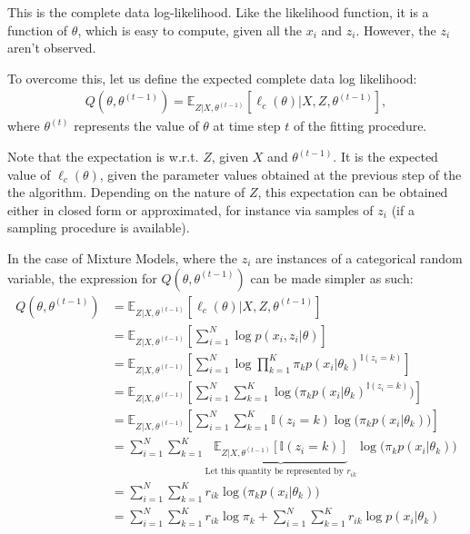 This is the complete data log-likelihood. Like the likelihood function, it is a
function of $\theta$, which is easy to compute, given all the $x_i$ and $z_i$.
However, the $z_i$ aren't observed.

To overcome this, let us define the expected complete data log likelihood:
\begin{align}
    Q(\theta, \theta^{(t-1)}) = \mathbb{E}_{Z|X, \theta^{(t-1)}}[\ell_c(\theta) | X, Z, \theta^{(t-1)}],
\end{align} where $\theta^{(t)}$ represents the value of $\theta$ at time step
$t$ of the fitting procedure.

Note that the expectation is w.r.t. $Z$, given $X$ and $\theta^{(t-1)}$. It is the
expected value of $\ell_c(\theta)$, given the parameter values obtained at the
previous step of the the algorithm. Depending on the nature of $Z$, this expectation
can be obtained either in closed form or approximated, for instance via samples
of $z_i$ (if a sampling procedure is available).

In the case of Mixture Models, where the $z_i$ are instances of a categorical
random variable, the expression for $Q(\theta, \theta^{(t-1)})$ can be made
simpler as such:
\begin{align}
    Q(\theta, \theta^{(t-1)}) &= \mathbb{E}_{Z|X, \theta^{(t-1)}}[\ell_c(\theta) | X, Z, \theta^{(t-1)}] \\
    &= \mathbb{E}_{Z|X, \theta^{(t-1)}}[\sum_{i=1}^N \log p(x_i, z_i | \theta)] \\
    &= \mathbb{E}_{Z|X, \theta^{(t-1)}}[\sum_{i=1}^N \log \prod_{k=1}^K \pi_k p(x_i | \theta_k)^{\mathbb{I}(z_i = k)}] \\
    &= \mathbb{E}_{Z|X, \theta^{(t-1)}}[\sum_{i=1}^N \sum_{k=1}^K \log\Big(\pi_k p(x_i | \theta_k)^{\mathbb{I}(z_i = k)}\Big)] \\
    &= \mathbb{E}_{Z|X, \theta^{(t-1)}}[\sum_{i=1}^N \sum_{k=1}^K \mathbb{I}(z_i = k) \log\Big(\pi_k p(x_i | \theta_k)\Big)] \\
    &= \sum_{i=1}^N \sum_{k=1}^K \underbrace{\mathbb{E}_{Z|X, \theta^{(t-1)}}[\mathbb{I}(z_i = k)]}_{\text{Let this quantity be represented by $r_{ik}$}} \log\Big(\pi_k p(x_i | \theta_k)\Big)\\
    &= \sum_{i=1}^N \sum_{k=1}^K r_{ik} \log\Big(\pi_k p(x_i | \theta_k)\Big) \\
    &= \sum_{i=1}^N \sum_{k=1}^K r_{ik} \log\pi_k + \sum_{i=1}^N \sum_{k=1}^K r_{ik} \log p(x_i | \theta_k) \\
\end{align}

